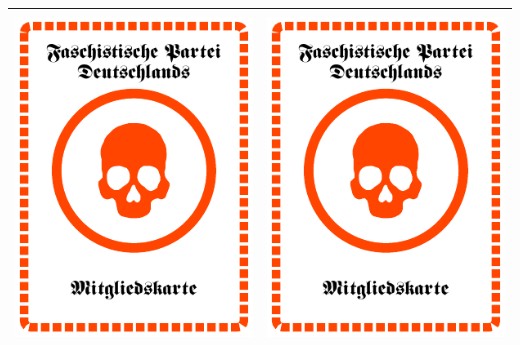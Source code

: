 \documentclass[12pt,a4paper,spanish]{article}
\begin{document}
\begin{table}
\begin{tabular}{|c|c|}
			\midrule
			\includegraphics[height=8.7cm, angle=90]{./Drawings/party_fascist.pdf} &
			\includegraphics[height=8.7cm, angle=90]{./Drawings/party_fascist.pdf} \\
			\bottomrule
		\end{tabular}
	\end{table}

	\newpage
	
\end{document}
